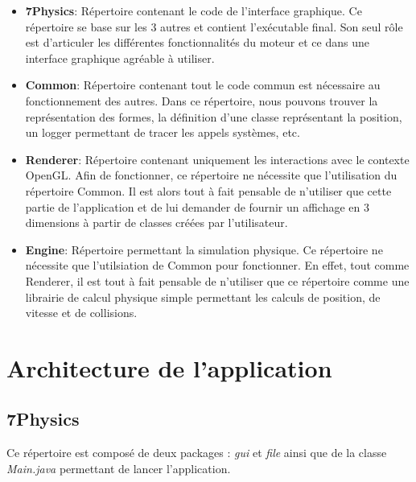 \documentclass[11pt]{report}
\begin{document}
\begin{itemize}
  \item \textbf{7Physics}: Répertoire contenant le code de l'interface graphique. Ce répertoire se base sur les 3 autres
        et contient l'exécutable final. Son seul rôle est d'articuler les différentes fonctionnalités du moteur et ce
        dans une interface graphique agréable à utiliser.\newline
  \item\textbf{Common}: Répertoire contenant tout le code commun est nécessaire au fonctionnement des autres. Dans ce
        répertoire, nous pouvons trouver la représentation des formes, la définition d'une classe représentant la position,
        un logger permettant de tracer les appels systèmes, etc.\newline
  \item \textbf{Renderer}: Répertoire contenant uniquement les interactions avec le contexte OpenGL. Afin de fonctionner,
        ce répertoire ne nécessite que l'utilisation du répertoire Common. Il est alors tout à fait pensable de n'utiliser
        que cette partie de l'application et de lui demander de fournir un affichage en 3 dimensions à partir de classes
        créées par l'utilisateur.\newline
  \item \textbf{Engine}: Répertoire permettant la simulation physique. Ce répertoire ne nécessite que l'utilsiation
        de Common pour fonctionner. En effet, tout comme Renderer, il est tout à fait pensable de n'utiliser que ce répertoire
        comme une librairie de calcul physique simple permettant les calculs de position, de vitesse et de collisions.\newline
\end{itemize}



\chapter{Architecture de l'application}


\section{7Physics}

Ce répertoire est composé de deux packages : \textit{gui} et \textit{file} ainsi que de la classe \textit{Main.java} permettant de lancer l'application.
\end{document}
